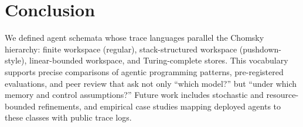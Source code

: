 \section{Conclusion}

We defined agent schemata whose trace languages parallel the Chomsky hierarchy: finite workspace (regular), stack-structured workspace (pushdown-style), linear-bounded workspace, and Turing-complete stores. This vocabulary supports precise comparisons of agentic programming patterns, pre-registered evaluations, and peer review that ask not only ``which model?'' but ``under which memory and control assumptions?'' Future work includes stochastic and resource-bounded refinements, and empirical case studies mapping deployed agents to these classes with public trace logs.
